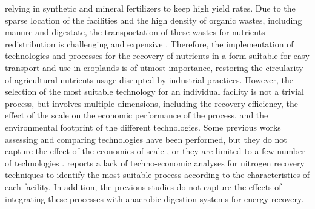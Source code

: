 \begin{refsection}[referencesCh6]
relying in synthetic and mineral fertilizers to keep high yield rates. Due to the sparse location of the facilities and the high density of organic wastes, including manure and digestate, the transportation of these wastes for nutrients redistribution is challenging and expensive \citep{sampat2018technologies}. Therefore, the implementation of technologies and processes for the recovery of nutrients in a form suitable for easy transport and use in croplands is of utmost importance, restoring the circularity of agricultural nutrients usage disrupted by industrial practices. However, the selection of the most suitable technology for an individual facility is not a trivial process, but involves multiple dimensions, including the recovery efficiency, the effect of the scale on the economic performance of the process, and the environmental footprint of the different technologies. Some previous works assessing and comparing technologies have been performed, but they do not capture the effect of the economies of scale \citep{munasinghe2020nitrogen, de2019resource}, or they are limited to a few number of technologies \citep{bolzonella2018nutrients}.
\citet{beckinghausen2020removal} reports a lack of techno-economic analyses for nitrogen recovery techniques to identify the most suitable process according to the characteristics of each facility. In addition, the previous studies do not capture the effects of integrating these processes with anaerobic digestion systems for energy recovery.


\end{refsection}
